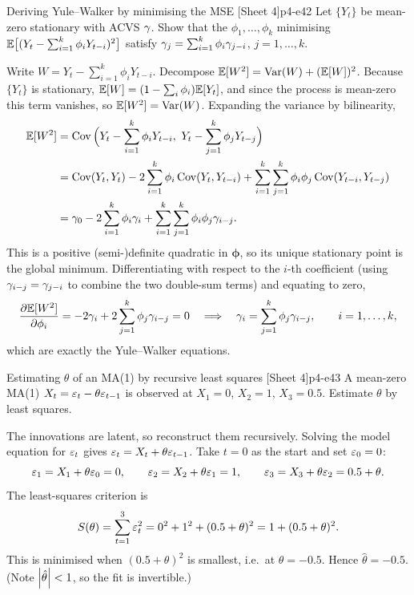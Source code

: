 \begin{exercise}{Deriving Yule--Walker by minimising the MSE \quad\textnormal{[Sheet 4]}}{p4-e42}
Let $\{Y_t\}$ be mean-zero stationary with ACVS $\gamma$. Show that the
$\phi_1,\dots,\phi_k$ minimising
$\mathbb{E}\big[(Y_t-\sum_{i=1}^k\phi_iY_{t-i})^2\big]$ satisfy
$\gamma_j=\sum_{i=1}^k\phi_i\gamma_{j-i}$, $j=1,\dots,k$.
\end{exercise}
\begin{solution}
Write $W=Y_t-\sum_{i=1}^k\phi_iY_{t-i}$. Decompose
$\mathbb{E}[W^2]=\operatorname{Var}(W)+(\mathbb{E}[W])^2$. Because $\{Y_t\}$ is stationary,
$\mathbb{E}[W]=(1-\sum_i\phi_i)\mathbb{E}[Y_t]$, and since the process is mean-zero this term
vanishes, so $\mathbb{E}[W^2]=\operatorname{Var}(W)$. Expanding the variance by bilinearity,
\[
\begin{aligned}
\E[W^2]
&=\Cov\Big(Y_t-\sum_{i=1}^k\phi_iY_{t-i},\ Y_t-\sum_{j=1}^k\phi_jY_{t-j}\Big)\\
&=\Cov(Y_t,Y_t)-2\sum_{i=1}^k\phi_i\Cov(Y_t,Y_{t-i})
   +\sum_{i=1}^k\sum_{j=1}^k\phi_i\phi_j\Cov(Y_{t-i},Y_{t-j})\\
&=\acvs_0-2\sum_{i=1}^k\phi_i\acvs_i
   +\sum_{i=1}^k\sum_{j=1}^k\phi_i\phi_j\acvs_{i-j}.
\end{aligned}
\]
This is a positive (semi-)definite quadratic in $\boldsymbol\phi$, so its unique
stationary point is the global minimum. Differentiating with respect to the
$i$-th coefficient (using $\gamma_{i-j}=\gamma_{j-i}$ to combine the two
double-sum terms) and equating to zero,
\[
\frac{\partial\mathbb{E}[W^2]}{\partial\phi_i}=-2\gamma_i+2\sum_{j=1}^k\phi_j\gamma_{i-j}=0
\quad\Longrightarrow\quad
\gamma_i=\sum_{j=1}^k\phi_j\gamma_{i-j},\qquad i=1,\dots,k,
\]
which are exactly the Yule--Walker equations.
\end{solution}

\begin{exercise}{Estimating $\theta$ of an MA(1) by recursive least squares \quad\textnormal{[Sheet 4]}}{p4-e43}
A mean-zero MA(1) $X_t=\varepsilon_t-\theta\varepsilon_{t-1}$ is observed at $X_1=0$, $X_2=1$,
$X_3=0.5$. Estimate $\theta$ by least squares.
\end{exercise}
\begin{solution}
The innovations are latent, so reconstruct them recursively. Solving the model
equation for $\varepsilon_t$ gives $\varepsilon_t=X_t+\theta\varepsilon_{t-1}$. Take $t=0$ as the
start and set $\varepsilon_0=0$:
\[
\varepsilon_1=X_1+\theta\varepsilon_0=0,\qquad
\varepsilon_2=X_2+\theta\varepsilon_1=1,\qquad
\varepsilon_3=X_3+\theta\varepsilon_2=0.5+\theta .
\]
The least-squares criterion is
\[
S(\theta)=\sum_{t=1}^3\varepsilon_t^2=0^2+1^2+(0.5+\theta)^2=1+(0.5+\theta)^2 .
\]
This is minimised when $(0.5+\theta)^2$ is smallest, i.e.\ at $\theta=-0.5$.
Hence $\hat\theta=-0.5$. (Note $\left\lvert \hat\theta \right\rvert<1$, so the fit is invertible.)
\end{solution}

